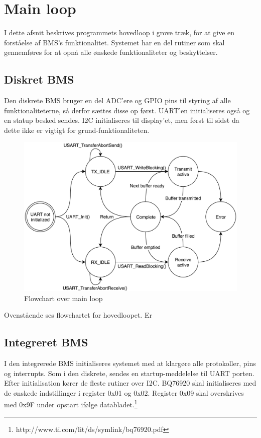 \section{Main loop}
I dette afsnit beskrives programmets hovedloop i grove træk, for at give en forståelse af BMS's funktionalitet. Systemet har en del rutiner som skal gennemføres for at opnå alle ønskede funktionaliteter og beskyttelser. 

\subsection{Diskret BMS}
Den diskrete BMS bruger en del ADC'ere og GPIO pins til styring af alle funktionaliteterne, så derfor sættes disse op først. UART'en initialiseres også og en statup besked sendes. I2C initialiseres til display'et, men først til sidst da dette ikke er vigtigt for grund-funktionaliteten. \\

\begin{figure}[h]
	\centering
	\includegraphics[width=14cm]{billeder/UART_sm.png}
	\caption{Flowchart over main loop}
	\label{fig:main_loop}
\end{figure}
Ovenstående ses flowchartet for hovedloopet. Er

\subsection{Integreret BMS}
I den integrerede BMS initialiseres systemet med at klargøre alle protokoller, pins og interrupts. Som i den diskrete, sendes en startup-meddelelse til UART porten. Efter initialisation kører de fleste rutiner over I2C. BQ76920 skal initialiseres med de ønskede indstillinger i register 0x01 og 0x02. Register 0x09 skal overskrives med 0x9F under opstart ifølge databladet.\footnote{http://www.ti.com/lit/ds/symlink/bq76920.pdf} \\

